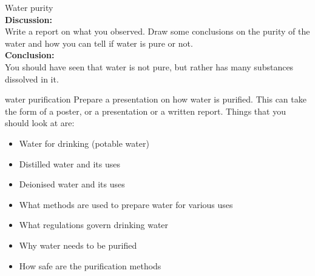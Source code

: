\begin{g_experiment}{Water purity}
\\
\label{m38138*id3429827}\noindent{}\textbf{Discussion:}\\
Write a report on what you observed. Draw some conclusions on the purity of the water and how you can tell if water is pure or not.
\\  
\label{m38138*id68921}\noindent{}\textbf{Conclusion:}\\
    You should have seen that water is not pure, but rather has many substances dissolved in it.
\\
\end{g_experiment}
\label{m38138*id672214}
            \begin{project}{water purification}
            \nopagebreak
\label{m38138*id97324}
Prepare a presentation on how water is purified. This can take the form of a poster, or a presentation or a written report. Things that you should look at are:
\label{m38138*id097324}\begin{itemize}[noitemsep]
            \item Water for drinking (potable water)\item Distilled water and its uses\item Deionised water and its uses\item What methods are used to prepare water for various uses\item What regulations govern drinking water\item Why water needs to be purified\item How safe are the purification methods\end{itemize}
\par 
\end{project}
            \nopagebreak

